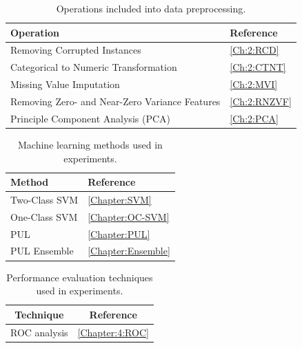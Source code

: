 \begin{table}[ht!]
\label{tab:data-pred-methods} 
\centering
\caption{Operations included into data preprocessing.}
 \begin{tabular}{|l|l|}\hline
  Operation&Reference\\ \hline
 Removing Corrupted Instances  & \ref{Ch:2:RCD} \\ \hline
        Categorical to Numeric Transformation & \ref{Ch:2:CTNT} \\
     \hline 
      Missing Value Imputation & \ref{Ch:2:MVI} \\
     \hline 
     
     Removing Zero- and Near-Zero Variance Features  & \ref{Ch:2:RNZVF} \\
     \hline 

     Principle Component Analysis (PCA) & \ref{Ch:2:PCA} \\
     \hline 
        \end{tabular}
\end{table}




\begin{table}[ht!]
\label{tab:machine-learn-tech} 
\centering
\caption{Machine learning methods used in experiments.}
 \begin{tabular}{|l|l|}\hline
         Method & Reference\\
        \hline
        Two-Class SVM & \ref{Chapter:SVM} \\
        \hline
        One-Class SVM & \ref{Chapter:OC-SVM} \\
        \hline
        PUL &  \ref{Chapter:PUL} \\
        \hline
        PUL Ensemble &  \ref{Chapter:Ensemble} \\
        \hline
    \end{tabular}
 
\end{table}

\begin{table}[ht!]
\label{tab:res-ev}
    \centering
    \caption{Performance evaluation techniques used in experiments.}
        \begin{tabular}{|c|c|}
        \hline
        Technique&Reference\\
        \hline
        ROC analysis & \ref{Chapter:4:ROC} \\
        \hline
        \end{tabular}
\end{table}



